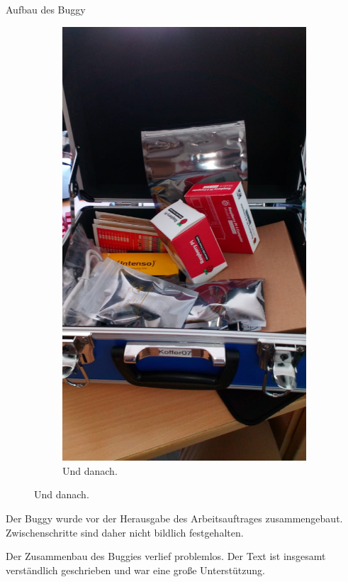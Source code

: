 \documentclass[12pt,twoside]{report}
\begin{document}
\begin{section}{Aufbau des Buggy}
\begin{figure}[h!]
\begin{subfigure}{0.45\linewidth}
    \includegraphics[width=\linewidth]{lernportfolio_assets/Buggy_Koffer.jpeg}
    \caption{Und danach.}
  \end{subfigure}
\end{figure}

Der Buggy wurde vor der Herausgabe des Arbeitsauftrages zusammengebaut. Zwischenschritte sind daher nicht bildlich festgehalten. 

Der Zusammenbau des Buggies verlief problemlos. Der Text ist insgesamt verständlich geschrieben und war eine große Unterstützung.


\end{section}
\end{document}
